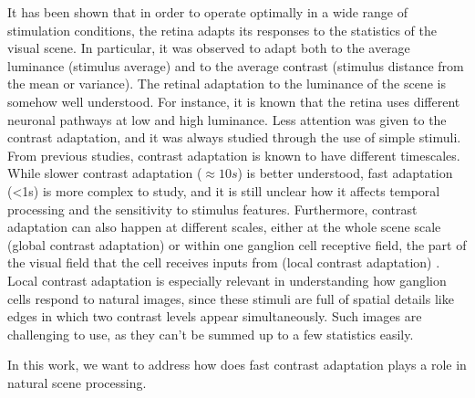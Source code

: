 It has been shown that in order to operate optimally in a wide range of stimulation conditions, the retina adapts its responses to the statistics of the visual scene. In particular, it was observed to adapt both to the average luminance (stimulus average) and to the average contrast (stimulus distance from the mean or variance). 
The retinal adaptation to the luminance of the scene is somehow well understood. For instance, it is known that the retina uses different neuronal pathways at low and high luminance. Less attention was given to the contrast adaptation, and it was always studied through the use of simple stimuli. From previous studies, contrast adaptation is known to have different timescales. While slower contrast adaptation ($\approx10s$) is better understood, fast adaptation (<1s) is more complex to study, and it is still unclear how it affects temporal processing and the sensitivity to stimulus features\citep{baccus_fast_2002}. Furthermore, contrast adaptation can also happen at different scales, either at the whole scene scale (global contrast adaptation) or within one ganglion cell receptive field, the part of the visual field that the cell receives inputs from (local contrast adaptation) \citep{garvert_local_2013}. Local contrast adaptation is especially relevant in understanding how ganglion cells respond to natural images, since these stimuli are full of spatial details like edges in which two contrast levels appear simultaneously. 
Such images are challenging to use, as they can't be summed up to a few statistics easily. 

In this work, we want to address how does fast contrast adaptation plays a role in natural scene processing. 

